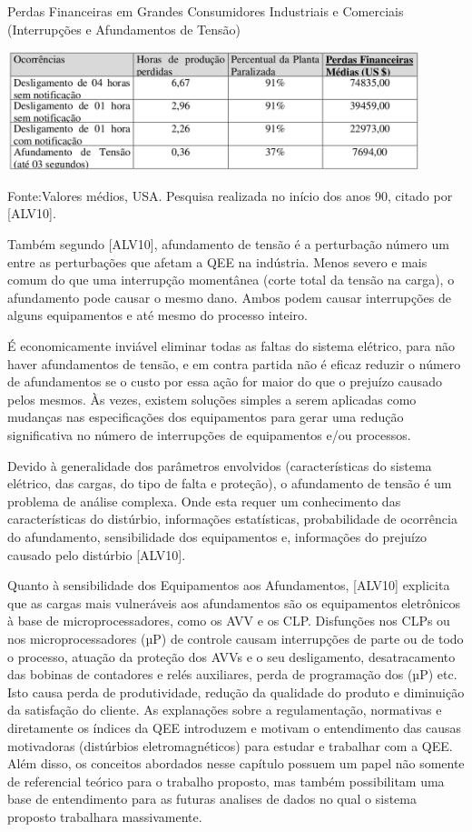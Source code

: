 \begin{table}[hbt]
\begin{center}
\caption{Perdas Financeiras em Grandes Consumidores Industriais e Comerciais (Interrupções e Afundamentos de Tensão)}
\includegraphics[width=12cm]{imagens/tab3_cap2.png}
\par{\small Fonte:Valores médios, USA. Pesquisa realizada no início dos anos 90, citado por [ALV10].}
\label{fig:tabperdas}
\end{center}
\end{table}
\par
Também segundo [ALV10], afundamento de tensão é a perturbação número um entre as perturbações que afetam a QEE na indústria. Menos severo e mais comum do que uma interrupção momentânea (corte total da tensão na carga), o afundamento pode causar o mesmo dano. Ambos podem causar interrupções de alguns equipamentos e até mesmo do processo inteiro.
\par
É economicamente inviável eliminar todas as faltas do sistema elétrico, para não haver afundamentos de tensão, e em contra partida não é eficaz reduzir o número de afundamentos se o custo por essa ação for maior do que o prejuízo causado pelos mesmos.
Às vezes, existem soluções simples a serem aplicadas como mudanças nas especificações dos equipamentos para gerar uma redução significativa no número de interrupções de equipamentos e/ou processos.
\par
Devido à generalidade dos parâmetros envolvidos (características do sistema elétrico, das cargas, do tipo de falta e proteção), o afundamento de tensão é um problema de análise complexa. Onde esta requer um conhecimento das características do distúrbio, informações estatísticas, probabilidade de ocorrência do afundamento, sensibilidade dos equipamentos e, informações do prejuízo causado pelo distúrbio [ALV10].
\par
Quanto à sensibilidade dos Equipamentos aos Afundamentos, [ALV10] explicita que as cargas mais vulneráveis aos afundamentos são os equipamentos eletrônicos à base de microprocessadores, como os AVV e os CLP. Disfunções nos CLPs ou nos microprocessadores (µP) de controle causam interrupções de parte ou de todo o processo, atuação da proteção dos AVVs e o seu desligamento, desatracamento das bobinas de contadores e relés auxiliares, perda de programação dos (µP) etc. Isto causa perda de produtividade, redução da qualidade do produto e diminuição da satisfação do cliente.
As explanações sobre a regulamentação, normativas e diretamente os índices da QEE introduzem e motivam o entendimento das causas motivadoras (distúrbios eletromagnéticos) para estudar e trabalhar com a QEE. Além disso, os conceitos abordados nesse capítulo possuem um papel não somente de referencial teórico para o trabalho proposto, mas também possibilitam uma base de entendimento para as futuras analises de dados no qual o sistema proposto trabalhara massivamente.